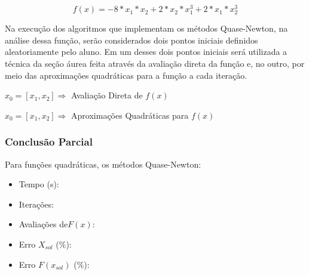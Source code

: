     \begin{equation*} 
        f(x) = -8*x_1*x_2+2*x_2*x_1^3+2*x_1*x_2^3
    \end{equation*}

    Na execução dos algoritmos que implementam os métodos Quase-Newton, na análise dessa função, serão considerados dois pontos iniciais definidos aleatoriamente pelo aluno. Em um desses dois pontos iniciais será utilizada a técnica da seção áurea feita através da avaliação direta da função e, no outro, por meio das aproximações quadráticas para a função a cada iteração.

        \begin{minipage}{\linewidth}
            \centering
            $x_0=[x_1,x_2]\Longrightarrow$  Avaliação Direta de $f(x)$
            \label{tab:tblg} 
            \writetable{\tblg}
            \bigskip
        \end{minipage}
        
        \begin{minipage}{\linewidth}
            \centering
            $x_0=[x_1,x_2]\Longrightarrow$  Aproximações Quadráticas para $f(x)$
            \label{tab:tblh} 
            \writetable{\tblh}
            \bigskip
        \end{minipage}

        \subsubsection{Conclusão Parcial}
            Para funções quadráticas, os métodos Quase-Newton:
            \begin{itemize}
            \item {Tempo (s):} 
            \item {Iterações:} 
            \item {Avaliações de$F(x)$:} 
            \item {Erro $X_{sol}$ (\%):} 
            \item {Erro $F(x_{sol})$ (\%):} 
            \end{itemize}
\newpage